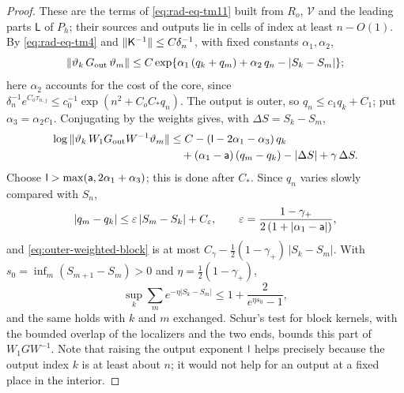 \begin{proof}
These are the terms of \eqref{eq:rad-eq-tm11} built from $R_o$,
$\mathcal V$ and the leading parts $\mathsf L$ of $P_h$; their sources
and outputs lie in cells of index at least $n-O(1)$. By
\eqref{eq:rad-eq-tm4} and $\|\mathsf K^{-1}\|\le C\delta_n^{-1}$, with fixed
constants $\alpha_1,\alpha_2$,
\[
 \|\vartheta_k\,G_{\rm out}\,\vartheta_m\|
 \le C\exp\{\alpha_1\,(q_k+q_m)+\alpha_2\,q_n-|S_k-S_m|\} ;
\]
here $\alpha_2$ accounts for the cost of the core, since
$\delta_n^{-1}e^{C_o\tau_{n,j}}\le c_0^{-1}\exp(n^2+C_oC_*q_n)$. The
output is outer, so $q_n\le c_1q_k+C_1$; put $\alpha_3=\alpha_2c_1$. Conjugating
by the weights gives, with $\Delta S=S_k-S_m$,
\begin{equation}\label{eq:outer-weighted-block}
 \begin{aligned}
 \log\|\vartheta_k\,W_1G_{\rm out}W^{-1}\vartheta_m\|
 &\le C-(\mathsf l-2\alpha_1-\alpha_3)\,q_k\\
 &\quad +(\alpha_1-\mathsf a)\,(q_m-q_k)-|\Delta S|+\gamma\,\Delta S .
 \end{aligned}
\end{equation}
Choose $\mathsf l>\max(\mathsf a,2\alpha_1+\alpha_3)$; this is done after $C_*$. Since $q_n$
varies slowly compared with $S_n$,
\[
 |q_m-q_k|\le\varepsilon\,|S_m-S_k|+C_\varepsilon,
 \qquad
 \varepsilon=\frac{1-\gamma_+}{2\,(1+|\alpha_1-\mathsf a|)},
\]
and \eqref{eq:outer-weighted-block} is at most
$C_\gamma-\tfrac12(1-\gamma_+)\,|S_k-S_m|$. With
$s_0=\inf_m(S_{m+1}-S_m)>0$ and $\eta=\tfrac12(1-\gamma_+)$,
\[
 \sup_k\sum_m e^{-\eta|S_k-S_m|}\le1+\frac2{e^{\eta s_0}-1},
\]
and the same holds with $k$ and $m$ exchanged. Schur's test for block
kernels, with the bounded overlap of the localizers and the two ends,
bounds this part of $W_1GW^{-1}$. Note that raising the output
exponent $\mathsf l$ helps precisely because the output index $k$ is at
least about $n$; it would not help for an output at a fixed place in
the interior.


\end{proof}
